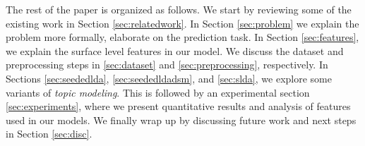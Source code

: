 The rest of the paper is organized as follows. We start by reviewing some of the existing work in Section \ref{sec:relatedwork}. In Section \ref{sec:problem} we explain the problem more formally, elaborate on the prediction task. In Section \ref{sec:features}, we explain the surface level features in our model. We discuss the dataset and preprocessing steps in \ref{sec:dataset} and \ref{sec:preprocessing}, respectively. In Sections \ref{sec:seededlda}, \ref{sec:seededldadsm}, and \ref{sec:slda}, we explore some variants of \textit{topic modeling}. This is followed by an experimental section \ref{sec:experiments}, where we present quantitative results and analysis of features used in our models. We finally wrap up by discussing future work and next steps in Section \ref{sec:disc}.


